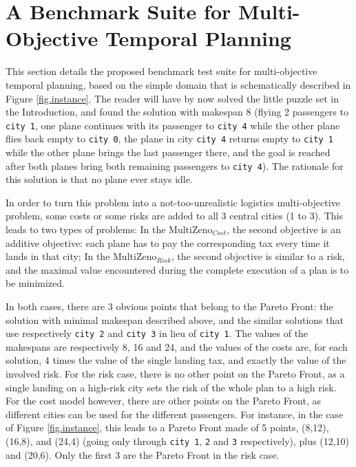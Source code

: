 \documentclass{llncs}
\def\MULTIZENO{{\sc MultiZeno}}
\begin{document}
\section{A Benchmark Suite for Multi-Objective Temporal Planning}
\label{benchmark}

This section details the proposed benchmark test suite for multi-objective temporal planning, based on  the simple domain that is schematically described in Figure \ref{fig.instance}. The reader will have by now solved the little puzzle set in the Introduction, and found the solution with makespan 8 (flying 2 passengers to {\tt city 1}, one plane continues with its passenger to {\tt city 4} while the other plane flies back empty to {\tt city 0}, the plane in city {\tt city 4} returns empty to {\tt city 1} while the other plane brings the last passenger there, and the goal is reached after both planes bring both remaining passengers to {\tt city 4}). The rationale for this solution is that no plane ever stays idle.

In order to turn this problem into a not-too-unrealistic logistics multi-objective problem, some costs or some risks are added to all 3 central cities (1 to 3). This leads to two types of problems: In the \MULTIZENO$_{Cost}$, the second objective is an additive objective: each plane has to pay the corresponding tax every time it lands in that city; In the \MULTIZENO$_{Risk}$, the second objective is similar to a risk, and the maximal value encountered during the complete execution of a plan is to be minimized. 

In both cases, there are 3 obvious points that belong to the Pareto Front: the solution with minimal makespan described above, and the similar solutions that use respectively {\tt city 2} and {\tt city 3} in lieu of {\tt city 1}. The values of the makespans are respectively 8, 16 and 24, and the values of the costs are, for each solution, 4 times the value of the single landing tax, and exactly the value of the involved risk. For the risk case, there is no other point on the Pareto Front, as a single landing on a high-risk city sets the risk of the whole plan to a high risk. For the cost model however, there are other points on the Pareto Front, as different cities can be used for the different passengers. For instance, in the case of Figure \ref{fig.instance}, this leads to a Pareto Front made of 5 points, (8,12), (16,8), and (24,4) (going only through {\tt city 1}, {\tt 2} and {\tt 3} respectively), plus (12,10) and (20,6). Only the first 3 are the Pareto Front in the risk case.
\end{document}
